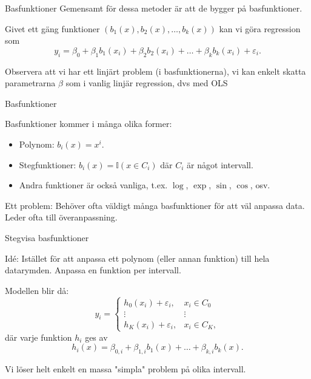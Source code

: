 \documentclass[10pt,english]{beamer}
\begin{document}
\begin{frame}{Basfunktioner}
    Gemensamt för dessa metoder är att de bygger på basfunktioner.

    Givet ett gäng funktioner $(b_1(x), b_2(x), \ldots, b_k(x))$ kan vi göra regression som
    \begin{equation*}
        y_i = \beta_0 + \beta_1 b_1(x_i) + \beta_2 b_2(x_i) + \ldots + \beta_k b_k(x_i) + \varepsilon_i.
    \end{equation*}

    Observera att vi har ett linjärt problem (i basfunktionerna), vi kan enkelt skatta parametrarna $\beta$ som i vanlig linjär regression, dvs med OLS

\end{frame}

\begin{frame}{Basfunktioner}

    Basfunktioner kommer i många olika former:
    \begin{itemize}
        \item Polynom: $b_i(x) = x^i$.
        \item Stegfunktioner: $b_i(x) = \mathbb{I}(x \in C_i)$ där $C_i$ är något intervall.
        \item Andra funktioner är också vanliga, t.ex. $\log$, $\exp$, $\sin$, $\cos$, osv.
    \end{itemize}
    
    Ett problem: Behöver ofta väldigt många basfunktioner för att väl anpassa data. Leder ofta till överanpassning.

\end{frame}

\begin{frame}{Stegvisa basfunktioner}

    \begin{greenbox}
        Idé: Istället för att anpassa ett polynom (eller annan funktion) till hela datarymden. Anpassa en funktion per intervall.
    \end{greenbox}

    Modellen blir då:
    \begin{equation*}
        y_i = \begin{cases}
            h_0(x_i) + \varepsilon_i, & x_i \in C_0 \\
            \vdots & \vdots \\
            h_K(x_i) + \varepsilon_i, & x_i \in C_K,
        \end{cases}
    \end{equation*}
    där varje funktion $h_i$ ges av
    \begin{equation*}
        h_i(x) = \beta_{0,i} + \beta_{1,i} b_1(x) + \ldots + \beta_{k,i} b_k(x).
    \end{equation*}

    Vi löser helt enkelt en massa "simpla" problem på olika intervall.
    
\end{frame}
\end{document}
